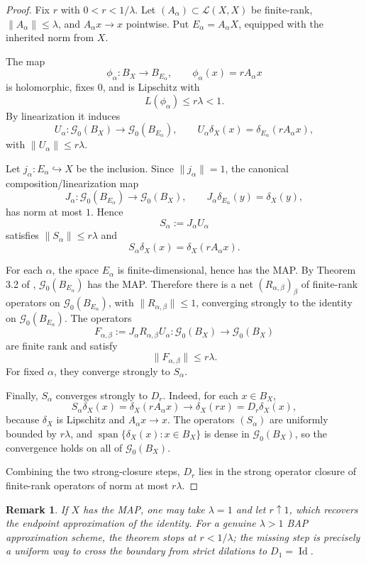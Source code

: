 \documentclass[11pt]{article}
\newtheorem{remark}{Remark}
\newcommand{\G}{\mathcal G}
\newcommand{\Id}{\operatorname{Id}}
\begin{document}
\begin{proof}
Fix \(r\) with \(0<r<1/\lambda\).  Let
\((A_\alpha)\subset\mathcal L(X,X)\) be finite-rank, \(\|A_\alpha\|\leq\lambda\),
and \(A_\alpha x\to x\) pointwise.  Put \(E_\alpha=A_\alpha X\), equipped with
the inherited norm from \(X\).

The map
\[
  \phi_\alpha:B_X\to B_{E_\alpha},\qquad
  \phi_\alpha(x)=rA_\alpha x
\]
is holomorphic, fixes \(0\), and is Lipschitz with
\[
  L(\phi_\alpha)\leq r\lambda<1.
\]
By linearization it induces
\[
  U_\alpha:\G_0(B_X)\to \G_0(B_{E_\alpha}),\qquad
  U_\alpha\delta_X(x)=\delta_{E_\alpha}(rA_\alpha x),
\]
with \(\|U_\alpha\|\leq r\lambda\).

Let \(j_\alpha:E_\alpha\hookrightarrow X\) be the inclusion.  Since
\(\|j_\alpha\|=1\), the canonical composition/linearization map
\[
  J_\alpha:\G_0(B_{E_\alpha})\to \G_0(B_X),\qquad
  J_\alpha\delta_{E_\alpha}(y)=\delta_X(y),
\]
has norm at most \(1\).  Hence
\[
  S_\alpha:=J_\alpha U_\alpha
\]
satisfies \(\|S_\alpha\|\leq r\lambda\) and
\[
  S_\alpha\delta_X(x)=\delta_X(rA_\alpha x).
\]

For each \(\alpha\), the space \(E_\alpha\) is finite-dimensional, hence has
the MAP.  By Theorem 3.2 of \cite{ADGM}, \(\G_0(B_{E_\alpha})\) has the MAP.
Therefore there is a net \((R_{\alpha,\beta})_\beta\) of finite-rank operators
on \(\G_0(B_{E_\alpha})\), with \(\|R_{\alpha,\beta}\|\leq1\), converging
strongly to the identity on \(\G_0(B_{E_\alpha})\).  The operators
\[
  F_{\alpha,\beta}:=J_\alpha R_{\alpha,\beta}U_\alpha
  :\G_0(B_X)\to\G_0(B_X)
\]
are finite rank and satisfy
\[
  \|F_{\alpha,\beta}\|\leq r\lambda.
\]
For fixed \(\alpha\), they converge strongly to \(S_\alpha\).

Finally, \(S_\alpha\) converges strongly to \(D_r\).  Indeed, for each
\(x\in B_X\),
\[
  S_\alpha\delta_X(x)=\delta_X(rA_\alpha x)\longrightarrow \delta_X(rx)
  =D_r\delta_X(x),
\]
because \(\delta_X\) is Lipschitz and \(A_\alpha x\to x\).  The operators
\((S_\alpha)\) are uniformly bounded by \(r\lambda\), and
\(\operatorname{span}\{\delta_X(x):x\in B_X\}\) is dense in \(\G_0(B_X)\), so
the convergence holds on all of \(\G_0(B_X)\).

Combining the two strong-closure steps, \(D_r\) lies in the strong operator
closure of finite-rank operators of norm at most \(r\lambda\).
\end{proof}

\begin{remark}
If \(X\) has the MAP, one may take \(\lambda=1\) and let \(r\uparrow1\), which
recovers the endpoint approximation of the identity.  For a genuine
\(\lambda>1\) BAP approximation scheme, the theorem stops at
\(r<1/\lambda\); the missing step is precisely a uniform way to cross the
boundary from strict dilations to \(D_1=\Id\).
\end{remark}
\end{document}
